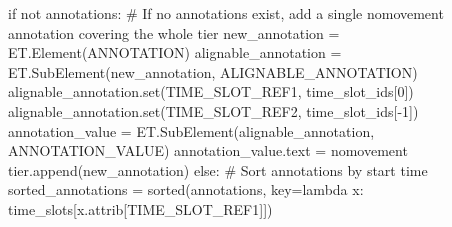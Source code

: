 \documentclass[
  letterpaper,
  DIV=11,
  numbers=noendperiod]{scrreprt}
\newenvironment{Shaded}{\begin{snugshade}}{\end{snugshade}}
\newcommand{\BuiltInTok}[1]{\textcolor[rgb]{0.00,0.23,0.31}{#1}}
\newcommand{\CommentTok}[1]{\textcolor[rgb]{0.37,0.37,0.37}{#1}}
\newcommand{\ControlFlowTok}[1]{\textcolor[rgb]{0.00,0.23,0.31}{#1}}
\newcommand{\DecValTok}[1]{\textcolor[rgb]{0.68,0.00,0.00}{#1}}
\newcommand{\KeywordTok}[1]{\textcolor[rgb]{0.00,0.23,0.31}{#1}}
\newcommand{\NormalTok}[1]{\textcolor[rgb]{0.00,0.23,0.31}{#1}}
\newcommand{\OperatorTok}[1]{\textcolor[rgb]{0.37,0.37,0.37}{#1}}
\newcommand{\StringTok}[1]{\textcolor[rgb]{0.13,0.47,0.30}{#1}}
\begin{document}
\begin{Shaded}
\begin{Highlighting}[]
        \ControlFlowTok{if} \KeywordTok{not}\NormalTok{ annotations:}
            \CommentTok{\# If no annotations exist, add a single \textquotesingle{}nomovement\textquotesingle{} annotation covering the whole tier}
\NormalTok{            new\_annotation }\OperatorTok{=}\NormalTok{ ET.Element(}\StringTok{\textquotesingle{}ANNOTATION\textquotesingle{}}\NormalTok{)}
\NormalTok{            alignable\_annotation }\OperatorTok{=}\NormalTok{ ET.SubElement(new\_annotation, }\StringTok{\textquotesingle{}ALIGNABLE\_ANNOTATION\textquotesingle{}}\NormalTok{)}
\NormalTok{            alignable\_annotation.}\BuiltInTok{set}\NormalTok{(}\StringTok{\textquotesingle{}TIME\_SLOT\_REF1\textquotesingle{}}\NormalTok{, time\_slot\_ids[}\DecValTok{0}\NormalTok{])}
\NormalTok{            alignable\_annotation.}\BuiltInTok{set}\NormalTok{(}\StringTok{\textquotesingle{}TIME\_SLOT\_REF2\textquotesingle{}}\NormalTok{, time\_slot\_ids[}\OperatorTok{{-}}\DecValTok{1}\NormalTok{])}
\NormalTok{            annotation\_value }\OperatorTok{=}\NormalTok{ ET.SubElement(alignable\_annotation, }\StringTok{\textquotesingle{}ANNOTATION\_VALUE\textquotesingle{}}\NormalTok{)}
\NormalTok{            annotation\_value.text }\OperatorTok{=} \StringTok{\textquotesingle{}nomovement\textquotesingle{}}
\NormalTok{            tier.append(new\_annotation)}
        \ControlFlowTok{else}\NormalTok{:}
            \CommentTok{\# Sort annotations by start time}
\NormalTok{            sorted\_annotations }\OperatorTok{=} \BuiltInTok{sorted}\NormalTok{(annotations, key}\OperatorTok{=}\KeywordTok{lambda}\NormalTok{ x: time\_slots[x.attrib[}\StringTok{\textquotesingle{}TIME\_SLOT\_REF1\textquotesingle{}}\NormalTok{]])}
            

\end{Highlighting}
\end{Shaded}
\end{document}
